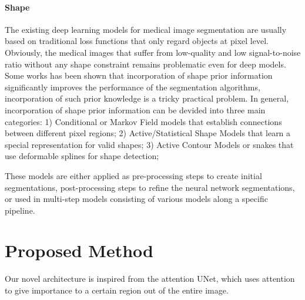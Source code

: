 \documentclass{ieeeaccess}
\begin{document}
  
  \paragraph{Shape} The existing deep learning models for medical image segmentation are usually based on traditional loss functions that only regard objects at pixel level. Obviously, the medical images that suffer from low-quality and low signal-to-noise ratio without any shape constraint remains problematic even for deep models. Some works has been shown that incorporation of shape prior information significantly improves the performance of the segmentation algorithms, incorporation of such prior knowledge is a tricky practical problem. In general, incorporation of shape prior information can be devided into three main categories: 1) Conditional or Markov Field models that establish connections between different pixel regions; 2) Active/Statistical Shape Models that learn a special representation for valid shapes; 3) Active Contour Models or snakes that use deformable splines for shape detection;
  
  These models are either applied as pre-processing steps to create initial segmentations, post-processing steps to refine the neural network segmentations, or used in multi-step models consisting of various models along a specific pipeline.
  
  
  \section{Proposed Method}\label{sec:method}
  Our novel architecture is inspired from the attention UNet, which uses attention to give importance to a certain region out
  of the entire image.
  
\end{document}
